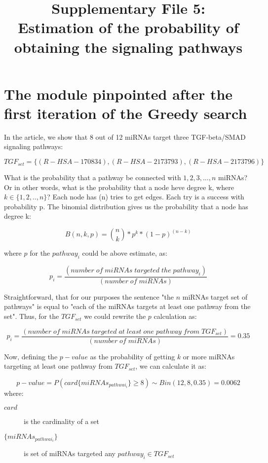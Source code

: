 \documentclass[a4paper, 12pt]{article}
\title{Supplementary File 5: 
	\\Estimation of the probability of obtaining the signaling pathways}
\date{}
\begin{document}
	\maketitle
	
\section{The module pinpointed after the first \mbox{iteration} of the Greedy search}

	In the article, we show that 8 out of 12 miRNAs target three  TGF-beta/SMAD signaling pathways:
	
	\begin{displaymath}
		TGF_{set} = \{(R-HSA-170834), (R-HSA-2173793), (R-HSA-2173796)\}
	\end{displaymath}
	
	What is the probability that a pathway be connected with $1,2,3,…,n$ miRNAs? Or in other words, what is the probability that a node heve degree k, where $k \in \{1,2,..,n\}$? Each node has (n) tries to get edges. Each try is a success with probability p. The binomial distribution gives us the probability that a node has degree k:
	
		\begin{displaymath}
		B(n,k,p)=\binom{n}{k}*p^k*(1-p)^{(n-k)}
		\end{displaymath}
	
	where $p$ for the $pathway_{i}$ could be above estimate, as:
	
		\begin{displaymath}
		p_i=\frac{(number\;of\;miRNAs\;targeted\;the\;pathway_i)}{(number\;of\;miRNAs)}
		\end{displaymath}
	
	 Straightforward, that for our purposes the sentence "the $n$ miRNAs target set of pathways" is equal to "each of the miRNAs targets at least one pathway from the set". Thus, for the $TGF_{set}$ we could rewrite the $p$ calculation as:
	 
	 \begin{displaymath}
	 	p_i=\frac{(number\;of\;miRNAs\;targeted\;at\;least\;one\;pathway\;from\;TGF_{set})}{(number\;of\;miRNAs)}=0.35
	 \end{displaymath}
	 
	Now, defining the $p-value$ as the probability of getting $k$ or more \mbox{miRNAs} targeting at least one pathway from $TGF_{set}$, we can calculate it as:
	
	\begin{displaymath}
		p-value = P(card\{miRNAs_{pathwai_i}\} \geq 8) \sim Bin(12, 8, 0.35)=0.0062
	\end{displaymath}
where:
\begin{description}
	\item[$card$] is the cardinality of a set
	\item[$\{miRNAs_{pathwai_i}\}$] is set of miRNAs targeted any $pathway_i \in TGF_{set}$
\end{description}
\end{document}
